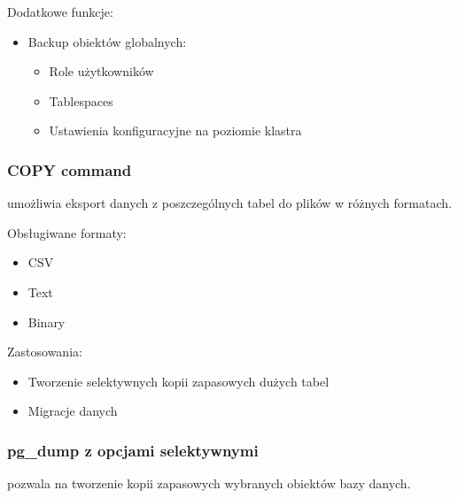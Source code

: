 \documentclass[a4paper,11pt,openany,english]{sphinxmanual}
\begin{document}
\sphinxAtStartPar
Dodatkowe funkcje:
\begin{itemize}
\item {} 
\sphinxAtStartPar
Backup obiektów globalnych:
\begin{itemize}
\item {} 
\sphinxAtStartPar
Role użytkowników

\item {} 
\sphinxAtStartPar
Tablespaces

\item {} 
\sphinxAtStartPar
Ustawienia konfiguracyjne na poziomie klastra

\end{itemize}

\end{itemize}


\subsubsection{COPY command}
\label{\detokenize{rozdzial2/Kopie_zapasowe_i_odzyskiwanie_danych/kopie_zapasowe_i_odzyskiwanie_danych:copy-command}}
\sphinxAtStartPar
{} umożliwia eksport danych z poszczególnych tabel do plików w różnych formatach.

\sphinxAtStartPar
Obsługiwane formaty:
\begin{itemize}
\item {} 
\sphinxAtStartPar
CSV

\item {} 
\sphinxAtStartPar
Text

\item {} 
\sphinxAtStartPar
Binary

\end{itemize}

\sphinxAtStartPar
Zastosowania:
\begin{itemize}
\item {} 
\sphinxAtStartPar
Tworzenie selektywnych kopii zapasowych dużych tabel

\item {} 
\sphinxAtStartPar
Migracje danych

\end{itemize}


\subsubsection{pg\_dump z opcjami selektywnymi}
\label{\detokenize{rozdzial2/Kopie_zapasowe_i_odzyskiwanie_danych/kopie_zapasowe_i_odzyskiwanie_danych:pg-dump-z-opcjami-selektywnymi}}
\sphinxAtStartPar
{} pozwala na tworzenie kopii zapasowych wybranych obiektów bazy danych.
\end{document}
